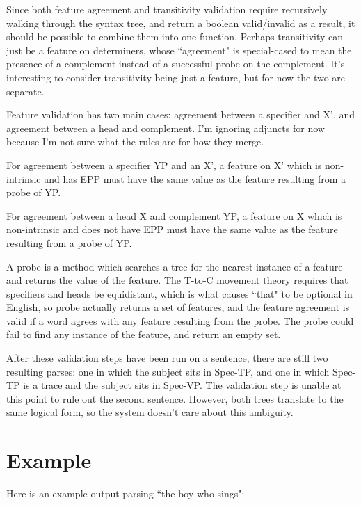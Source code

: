 \documentclass[11pt]{article}
\begin{document}
Since both feature agreement and transitivity validation require recursively walking through the
syntax tree, and return a boolean valid/invalid as a result, it should be possible to combine them
into one function. Perhaps transitivity can just be a feature on determiners, whose ``agreement"
is special-cased to mean the presence of a complement instead of a successful probe on the complement.
It's interesting to consider transitivity being just a feature, but for now the two are separate.

Feature validation has two main cases: agreement between a specifier and X', and agreement between
a head and complement. I'm ignoring adjuncts for now because I'm not sure what the rules are for
how they merge.

For agreement between a specifier YP and an X', a feature on X' which is non-intrinsic and has EPP
must have the same value as the feature resulting from a probe of YP.

For agreement between a head X and complement YP, a feature on X which is non-intrinsic and does not
have EPP must have the same value as the feature resulting from a probe of YP.

A probe is a method which searches a tree for the nearest instance of a feature and returns the value
of the feature. The T-to-C movement theory requires that specifiers and heads be equidistant, which
is what causes ``that" to be optional in English, so probe actually returns a set of features, and
the feature agreement is valid if a word agrees with any feature resulting from the probe. The probe
could fail to find any instance of the feature, and return an empty set.

After these validation steps have been run on a sentence, there are still two resulting parses: one
in which the subject sits in Spec-TP, and one in which Spec-TP is a trace and the subject sits in
Spec-VP. The validation step is unable at this point to rule out the second sentence. However,
both trees translate to the same logical form, so the system doesn't care about this ambiguity.

\section{Example}
Here is an example output parsing ``the boy who sings":
\end{document}
